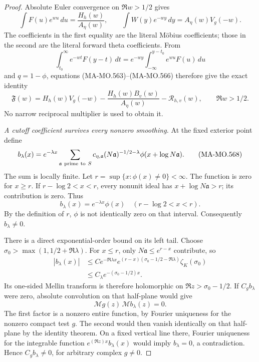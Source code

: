 \begin{proof}
Absolute Euler convergence on \(\Re w>1/2\) gives
\[
       \int F(u)e^{wu}\,du=\frac{H_h(w)}{A_\eta(w)},
       \qquad
       \int W(y)e^{-wy}\,dy=A_\eta(w)V_g(-w).
 \tag{MA-MO.566}
\]
The coefficients in the first equality are the literal
M\"obius coefficients; those in the second are the
literal forward theta coefficients. From
\[
 \int_{t_0}^\infty e^{-wt}F(y-t)\,dt
       =e^{-wy}\int_{-\infty}^{y-t_0}e^{wu}F(u)\,du
\]
and \(q=1-\phi\), equations (MA-MO.563)--(MA-MO.566)
therefore give the exact identity
\[
 \mathfrak F(w)
   =H_h(w)V_g(-w)
       -\frac{H_h(w)B_v(w)}{A_\eta(w)}
       -\mathcal R_{h,v}(w),
                    \qquad\Re w>1/2 .
 \tag{MA-MO.567}
\]
No narrow reciprocal multiplier is used to obtain it.

\emph{A cutoff coefficient survives every nonzero smoothing.}
At the fixed exterior point define
\[
 b_\lambda(x)=e^{-\lambda x}
       \sum_{\mathfrak a\ {\rm prime\ to}\ S}
         c_{\eta,\mathfrak a}(N\mathfrak a)^{-1/2-\lambda}
                                \phi(x+\log N\mathfrak a).
 \tag{MA-MO.568}
\]
The sum is locally finite. Let
\(r=\sup\{x:\phi(x)\ne0\}<\infty\). The function is
zero for \(x\ge r\). If \(r-\log2<x<r\), every
nonunit ideal has \(x+\log N\mathfrak a>r\); its
contribution is zero. Thus
\[
              b_\lambda(x)=e^{-\lambda x}\phi(x)
                              \quad(r-\log2<x<r).
 \tag{MA-MO.569}
\]
By the definition of \(r\), \(\phi\) is not identically
zero on that interval. Consequently \(b_\lambda\ne0\).

There is a direct exponential-order bound on its left
tail. Choose
\(\sigma_0>\max(1,1/2+\Re\lambda)\). For \(x\le r\),
only \(N\mathfrak a\le e^{r-x}\) contribute, so
\[
 \begin{aligned}
 |b_\lambda(x)|
 &\le C e^{-\Re\lambda x}
   e^{(r-x)(\sigma_0-1/2-\Re\lambda)}
                         \zeta_K(\sigma_0)\\
 &\le C_\lambda e^{-(\sigma_0-1/2)x}.
 \end{aligned}
 \tag{MA-MO.570}
\]
Its one-sided Mellin transform is therefore holomorphic
on \(\Re z>\sigma_0-1/2\). If \(C_gb_\lambda\) were
zero, absolute convolution on that half-plane would give
\[
                  \mathcal Mg(z)\,\mathcal Mb_\lambda(z)=0.
 \tag{MA-MO.571}
\]
The first factor is a nonzero entire function, by
Fourier uniqueness for the nonzero compact test \(g\).
The second would then vanish identically on that
half-plane by the identity theorem. On a fixed vertical
line there, Fourier uniqueness for the integrable function
\(e^{(\Re z)x}b_\lambda(x)\) would imply
\(b_\lambda=0\), a contradiction. Hence
\(C_gb_\lambda\ne0\), for arbitrary complex \(g\ne0\).


\end{proof}
